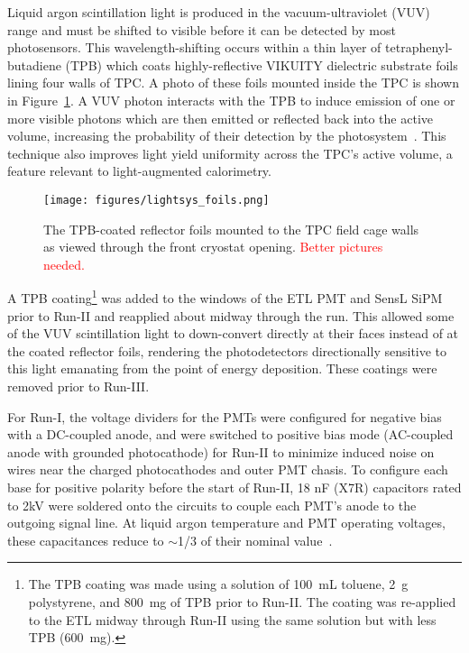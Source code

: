 Liquid argon scintillation light is produced in the vacuum-ultraviolet (VUV) range and must be shifted to visible before it can be detected by most photosensors.  This wavelength-shifting occurs within a thin layer of tetraphenyl-butadiene (TPB) which coats highly-reflective VIKUITY dielectric substrate foils lining four walls of TPC.  A photo of these foils mounted inside the TPC is shown in Figure~\ref{lightsys_foils}.  A VUV photon interacts with the TPB to induce emission of one or more visible photons which are then emitted or reflected back into the active volume, increasing the probability of their detection by the photosystem~\cite{lightsys-szelc}. This technique also improves light yield uniformity across the TPC's active volume, a feature relevant to light-augmented calorimetry.

\begin{figure}
\centering
\texttt{[image: figures/lightsys\_foils.png]}
\caption{\label{lightsys_foils}The TPB-coated reflector foils mounted to the TPC field cage walls as viewed through the front cryostat opening. {\textcolor{red}{Better pictures needed.}}}
\end{figure}


A TPB coating\footnote{The TPB coating was made using a solution of 100~mL toluene, 2~g polystyrene, and 800~mg of TPB prior to Run-II. The coating was re-applied to the ETL midway through Run-II using the same solution but with less TPB (600~mg).} was added to the windows of the ETL PMT and SensL SiPM prior to Run-II and reapplied about midway through the run.  This allowed some of the VUV scintillation light to down-convert directly at their faces instead of at the coated reflector foils, rendering the photodetectors directionally sensitive to this light emanating from the point of energy deposition.  These coatings were removed prior to Run-III.

For Run-I, the voltage dividers for the PMTs were configured for negative bias with a DC-coupled anode, and were switched to positive bias mode (AC-coupled anode with grounded photocathode) for Run-II to minimize induced noise on wires near the charged photocathodes and outer PMT chasis.  To configure each base for positive polarity before the start of Run-II, 18 nF (X7R) capacitors rated to 2kV were soldered onto the circuits to couple each PMT's anode to the outgoing signal line.  At liquid argon temperature and PMT operating voltages, these capacitances reduce to $\sim$1/3 of their nominal value~\cite{lightsys-capacitors,lightsys-ubsplitting}.

